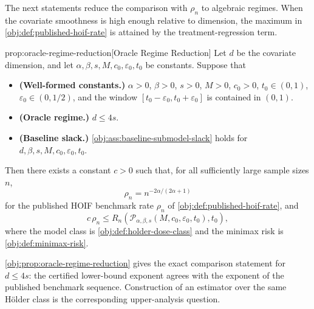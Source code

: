 \documentclass[11pt]{article}
\begin{document}
The next statements reduce the comparison with \(\rho_n\) to algebraic regimes. When the covariate smoothness is high enough relative to dimension, the maximum in \cref{obj:def:published-hoif-rate} is attained by the treatment-regression term.

\begin{propositionv}{prop:oracle-regime-reduction}[Oracle Regime Reduction]
Let \(d\) be the covariate dimension, and let \(\alpha,\beta,s,M,c_0,\varepsilon_0,t_0\) be constants. Suppose that
\begin{itemize}
\item \textbf{(Well-formed constants.)} \(\alpha>0\), \(\beta>0\), \(s>0\), \(M>0\), \(c_0>0\), \(t_0\in(0,1)\), \(\varepsilon_0\in(0,1/2)\), and the window \([t_0-\varepsilon_0,t_0+\varepsilon_0]\) is contained in \((0,1)\).
\item \textbf{(Oracle regime.)} \(d\le 4s\).
\item \textbf{(Baseline slack.)} \cref{obj:ass:baseline-submodel-slack} holds for \(d,\beta,s,M,c_0,\varepsilon_0,t_0\).
\end{itemize}
Then there exists a constant \(c>0\) such that, for all sufficiently large sample sizes \(n\),
\[
\rho_n
=
n^{-2\alpha/(2\alpha+1)}
\]
for the published HOIF benchmark rate \(\rho_n\) of \cref{obj:def:published-hoif-rate}, and
\[
c\,\rho_n
\le
R_n\!\left(\mathcal P_{\alpha,\beta,s}(M,c_0,\varepsilon_0,t_0),t_0\right),
\]
where the model class is \cref{obj:def:holder-dose-class} and the minimax risk is \cref{obj:def:minimax-risk}.
\end{propositionv}

\cref{obj:prop:oracle-regime-reduction} gives the exact comparison statement for \(d\le 4s\): the certified lower-bound exponent agrees with the exponent of the published benchmark sequence. Construction of an estimator over the same Hölder class is the corresponding upper-analysis question.
\end{document}

